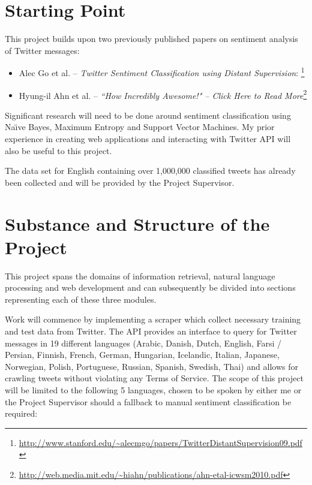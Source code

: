 \section{Starting Point}

This project builds upon two previously published papers on sentiment analysis of Twitter messages:

\begin{itemize}

\item Alec Go et al. -- \emph{Twitter Sentiment Classification using Distant Supervision}:  \footnote{\url{http://www.stanford.edu/~alecmgo/papers/TwitterDistantSupervision09.pdf}}

\item Hyung-il Ahn et al. -- \emph{``How Incredibly Awesome!" -- Click Here to Read More}\footnote{\url{http://web.media.mit.edu/~hiahn/publications/ahn-etal-icwsm2010.pdf}}

\end{itemize}

Significant research will need to be done around sentiment classification using Na\"{\i}ve Bayes, Maximum Entropy and Support Vector Machines.
My prior experience in creating web applications and interacting with Twitter API will also be useful to this project.

The data set for English containing over 1,000,000 classified tweets has already been collected and will be provided by the Project Supervisor.

\section{Substance and Structure of the Project}

This project spans the domains of information retrieval, natural language processing and web development and can subsequently be divided into sections representing each of these three modules.

Work will commence by implementing a scraper which collect necessary training and test data from Twitter. The API provides an interface to query for Twitter messages in 19 different languages (Arabic, Danish, Dutch, English, Farsi / Persian, Finnish, French, German, Hungarian, Icelandic, Italian, Japanese, Norwegian, Polish, Portuguese, Russian, Spanish, Swedish, Thai) and allows for crawling tweets without violating any Terms of Service. The scope of this project will be limited to the following 5 languages, chosen to be spoken by either me or the Project Supervisor should a fallback to manual sentiment classification be required:

